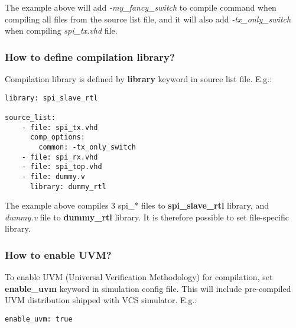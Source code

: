 \documentclass{tropic_design_spec}
\begin{document}
The example above will add \textit{-my_fancy_switch} to compile command when
compiling all files from the source list file, and it will also add 
\textit{-tx_only_switch} when compiling \textit{spi_tx.vhd} file.



\subsubsection{How to define compilation library?}
\label{sec:how-to-define-compilation-library}

Compilation library is defined by \textbf{library} keyword in source list file. E.g.:

\begin{lstlisting}
library: spi_slave_rtl

source_list:
    - file: spi_tx.vhd
      comp_options:
        common: -tx_only_switch
    - file: spi_rx.vhd
    - file: spi_top.vhd
    - file: dummy.v
      library: dummy_rtl
\end{lstlisting}

The example above compiles 3 spi_* files to \textbf{spi_slave_rtl} library, and
\textit{dummy.v} file to \textbf{dummy_rtl} library. It is therefore possible to
set file-specific library.



\subsubsection{How to enable UVM?}
\label{sec:how-to-enable-uvm}

To enable UVM (Universal Verification Methodology) for compilation, set \textbf{enable_uvm}
keyword in simulation config file. This will include pre-compiled UVM distribution shipped
with VCS simulator. E.g.:

\begin{lstlisting}
enable_uvm: true
\end{lstlisting}
\end{document}
